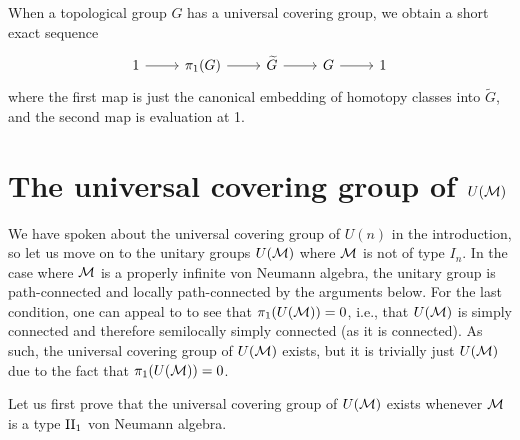 \documentclass{amsart}
\begin{document}
  
  When a topological group $G$ has a universal covering group, we obtain a short exact sequence
  \begin{equation}\label{eq:covering group ses}
  \begin{tikzcd}
1 \arrow[r] & \pi_1(G) \arrow[r] & \widetilde{G} \arrow[r] & G \arrow[r] & 1
\end{tikzcd}
\end{equation}
where the first map is just the canonical embedding of homotopy classes into $\tilde{G}$, and the second map is evaluation at 1. 
  


\section{The universal covering group of $U(\mathcal{M})$}\label{sec:universal cover of U(M)}

We have spoken about the universal covering group of $U(n)$ in the introduction, so let us move on to the unitary groups $U(\mathcal{M})$ where $\mathcal{M}$ is not of type $I_n$.
In the case where $\mathcal{M}$ is a properly infinite von Neumann algebra, the unitary group is path-connected and locally path-connected by the arguments below. For the last condition, one can appeal to \cite[Theorem 3.5]{Handelman78} to see that $\pi_1(U(\mathcal{M})) = 0$, i.e., that $U(\mathcal{M})$ is simply connected and therefore semilocally simply connected (as it is connected).
As such, the universal covering group of $U(\mathcal{M})$ exists, but it is trivially just $U(\mathcal{M})$ due to the fact that $\pi_1(U(\mathcal{M})) = 0$.

Let us first prove that the universal covering group of $U(\mathcal{M})$ exists whenever $\mathcal{M}$ is a type $\text{II}_1$ von Neumann algebra. 
\end{document}
